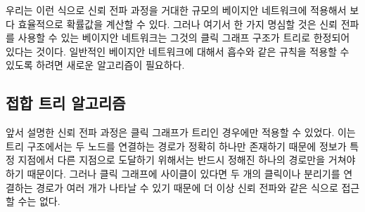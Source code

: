 \documentclass[a4paper]{oblivoir}
\begin{document}
우리는 이런 식으로 신뢰 전파 과정을 거대한 규모의 베이지안 네트워크에 적용해서 보다 효율적으로 확률값을 계산할 수 있다. 그러나 여기서 한 가지 명심할 것은 신뢰 전파를 사용할 수 있는 베이지안 네트워크는 그것의 클릭 그래프 구조가 트리로 한정되어 있다는 것이다. 일반적인 베이지안 네트워크에 대해서 흡수와 같은 규칙을 적용할 수 있도록 하려면 새로운 알고리즘이 필요하다.  


\subsection{접합 트리 알고리즘}

앞서 설명한 신뢰 전파 과정은 클릭 그래프가 트리인 경우에만 적용할 수 있었다. 이는 트리 구조에서는 두 노드를 연결하는 경로가 정확히 하나만 존재하기 때문에 정보가 특정 지점에서 다른 지점으로 도달하기 위해서는 반드시 정해진 하나의 경로만을 거쳐야 하기 때문이다. 그러나 클릭 그래프에 사이클이 있다면 두 개의 클릭이나 분리기를 연결하는 경로가 여러 개가 나타날 수 있기 때문에 더 이상 신뢰 전파와 같은 식으로 접근할 수는 없다.  
\end{document}
